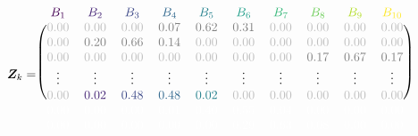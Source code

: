 \scriptsize
$$
\design_k = \begin{blockarray}{cccccccccc}
\color[HTML]{440154}B_{1} & \color[HTML]{482878}B_{2} & \color[HTML]{3E4A89}B_{3} & \color[HTML]{31688E}B_{4} & \color[HTML]{26828E}B_{5} & \color[HTML]{1F9E89}B_{6} & \color[HTML]{35B779}B_{7} & \color[HTML]{6DCD59}B_{8} & \color[HTML]{B4DE2C}B_{9} & \color[HTML]{FDE725}B_{10} \\
\begin{block}{(cccccccccc)}
\color{lightgray}0.00 & \color{lightgray}0.00 & \color{lightgray}0.00 & \color{gray}0.07 & \color{gray}0.62 & \color{gray}0.31 & \color{lightgray}0.00 & \color{lightgray}0.00 & \color{lightgray}0.00 & \color{lightgray}0.00\color{black}\\
  \color{lightgray}0.00 & \color{gray}0.20 & \color{gray}0.66 & \color{gray}0.14 & \color{lightgray}0.00 & \color{lightgray}0.00 & \color{lightgray}0.00 & \color{lightgray}0.00 & \color{lightgray}0.00 & \color{lightgray}0.00\color{black}\\
  \color{lightgray}0.00 & \color{lightgray}0.00 & \color{lightgray}0.00 & \color{lightgray}0.00 & \color{lightgray}0.00 & \color{lightgray}0.00 & \color{lightgray}0.00 & \color{gray}0.17 & \color{gray}0.67 & \color{gray}0.17\color{black}\\
  \color{black}\vdots & \color{black}\vdots & \color{black}\vdots & \color{black}\vdots & \color{black}\vdots & \color{black}\vdots & \color{black}\vdots & \color{black}\vdots & \color{black}\vdots & \color{black}\vdots\\
  \color{lightgray}0.00 & \color[HTML]{482878}0.02 & \color[HTML]{3E4A89}0.48 & \color[HTML]{31688E}0.48 & \color[HTML]{26828E}0.02 & \color{lightgray}0.00 & \color{lightgray}0.00 & \color{lightgray}0.00 & \color{lightgray}0.00 & \color{lightgray}0.00\color{black}\\
  
\end{block}
\color{white}0.00 & \color{white}0.00 & \color{white}0.00 & \color{white}0.01 & \color{white}0.40 & \color{white}0.55 & \color{white}0.04 & \color{white}0.00 & \color{white}0.00 & \color{white}0.00\color{black}\\
  \color{white}0.00 & \color{white}0.00 & \color{white}0.00 & \color{white}0.00 & \color{white}0.00 & \color{white}0.29 & \color{white}0.63 & \color{white}0.08 & \color{white}0.00 & \color{white}0.00\color{black}
\end{blockarray}
$$
\normalsize
